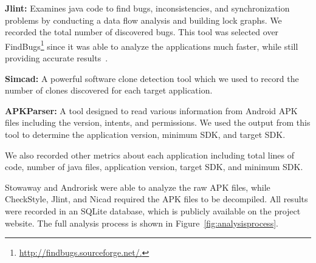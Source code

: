  \textbf{Jlint:} Examines java code to find bugs, inconsistencies, and synchronization problems by conducting a data flow analysis and building lock graphs. We recorded the total number of discovered bugs. This tool was selected over FindBugs\footnote{\url{http://findbugs.sourceforge.net/.}} since it was able to analyze the applications much faster, while still providing accurate results~\cite{rutar2004comparison}.

 \textbf{Simcad:} A powerful software clone detection tool which we used to record the number of clones discovered for each target application.

 \textbf{APKParser:} A tool designed to read various information from Android APK files including the version, intents, and permissions. We used the output from this tool to determine the application version, minimum SDK, and target SDK.

We also recorded other metrics about each application including total lines of code, number of java files, application version, target SDK, and minimum SDK.



Stowaway and Androrisk were able to analyze the raw APK files, while CheckStyle, Jlint, and Nicad required the APK files to be decompiled. All results were recorded in an SQLite database, which is publicly available on the project website. The full analysis process is shown in Figure~\ref{fig:analysisprocess}.

